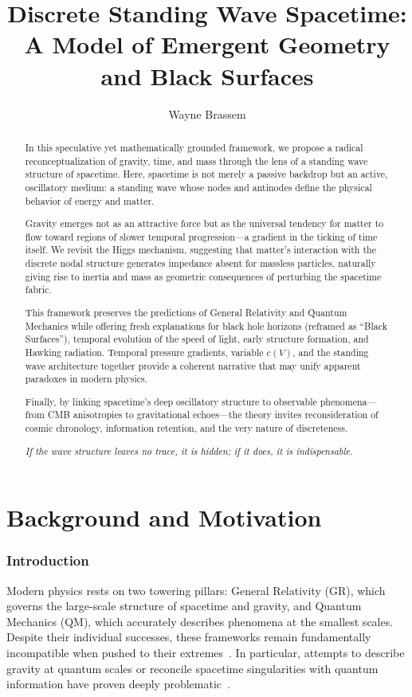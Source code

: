 \documentclass[12pt]{article}
\title{Discrete Standing Wave Spacetime: A Model of Emergent Geometry and Black Surfaces}
\author{Wayne Brassem}
\begin{document}
\maketitle

\begin{abstract}
In this speculative yet mathematically grounded framework, we propose a radical reconceptualization of gravity, time, and mass through the lens of a standing wave structure of spacetime. Here, spacetime is not merely a passive backdrop but an active, oscillatory medium: a standing wave whose nodes and antinodes define the physical behavior of energy and matter.

Gravity emerges not as an attractive force but as the universal tendency for matter to flow toward regions of slower temporal progression---a gradient in the ticking of time itself. We revisit the Higgs mechanism, suggesting that matter’s interaction with the discrete nodal structure generates impedance absent for massless particles, naturally giving rise to inertia and mass as geometric consequences of perturbing the spacetime fabric.

This framework preserves the predictions of General Relativity and Quantum Mechanics while offering fresh explanations for black hole horizons (reframed as “Black Surfaces”), temporal evolution of the speed of light, early structure formation, and Hawking radiation. Temporal pressure gradients, variable $c(V)$, and the standing wave architecture together provide a coherent narrative that may unify apparent paradoxes in modern physics.

Finally, by linking spacetime’s deep oscillatory structure to observable phenomena---from CMB anisotropies to gravitational echoes---the theory invites reconsideration of cosmic chronology, information retention, and the very nature of discreteness.

\vspace{1em}

\textit{If the wave structure leaves no trace, it is hidden; if it does, it is indispensable.}
\end{abstract}

\newpage


\tableofcontents

\cleardoublepage
\part{Background and Motivation}

\section{Introduction}
Modern physics rests on two towering pillars: General Relativity (GR), which governs the large-scale structure of spacetime and gravity, and Quantum Mechanics (QM), which accurately describes phenomena at the smallest scales. Despite their individual successes, these frameworks remain fundamentally incompatible when pushed to their extremes~\cite{waldGR1984}. In particular, attempts to describe gravity at quantum scales or reconcile spacetime singularities with quantum information have proven deeply problematic~\cite{einstein1915, hawking1976}.
\end{document}
